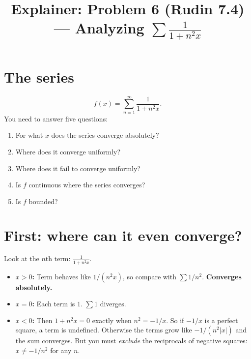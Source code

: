\documentclass[12pt]{article}
\title{Explainer: Problem 6 (Rudin 7.4) --- Analyzing $\sum \frac{1}{1+n^2 x}$}
\author{}
\date{}
\begin{document}
\maketitle

\section*{The series}
$$
f(x) = \sum_{n=1}^{\infty} \frac{1}{1 + n^2 x}.
$$
You need to answer five questions:
\begin{enumerate}
  \item For what $x$ does the series converge absolutely?
  \item Where does it converge uniformly?
  \item Where does it fail to converge uniformly?
  \item Is $f$ continuous where the series converges?
  \item Is $f$ bounded?
\end{enumerate}

\section*{First: where can it even converge?}
Look at the $n$th term: $\frac{1}{1 + n^2 x}$.
\begin{itemize}
  \item \textbf{$x > 0$:} Term behaves like $1/(n^2 x)$, so compare with $\sum 1/n^2$. \textbf{Converges absolutely.}
  \item \textbf{$x = 0$:} Each term is $1$. $\sum 1$ diverges.
  \item \textbf{$x < 0$:} Then $1 + n^2 x = 0$ exactly when $n^2 = -1/x$. So if $-1/x$ is a perfect square, a term is undefined. Otherwise the terms grow like $-1/(n^2 |x|)$ and the sum converges. But you must \emph{exclude} the reciprocals of negative squares: $x \neq -1/n^2$ for any $n$.
\end{itemize}

\begin{center}
\end{center}
\end{document}
